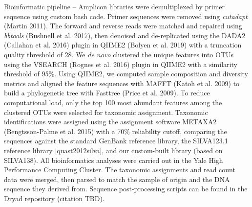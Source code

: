 \documentclass[12pt,]{article}
\begin{document}
Bioinformatic pipeline -- Amplicon libraries were demultiplexed by primer sequence using custom bash code. Primer sequences were removed using \emph{cutadapt} (Martin 2011). The forward and reverse reads were matched and repaired using \emph{bbtools} (Bushnell et al. 2017), then denoised and de-replicated using the DADA2 (Callahan et al. 2016) plugin in QIIME2 (Bolyen et al. 2019) with a truncation quality threshold of 28. We \emph{de novo} clustered the unique features into OTUs using the VSEARCH (Rognes et al. 2016) plugin in QIIME2 with a similarity threshold of 95\%. Using QIIME2, we computed sample composition and diversity metrics and aligned the feature sequences with MAFFT (Katoh et al. 2009) to build a phylogenetic tree with Fasttree (Price et al. 2009). To reduce computational load, only the top 100 most abundant features among the clustered OTUs were selected for taxonomic assignment. Taxonomic identifications were assigned using the assignment software METAXA2 (Bengtsson-Palme et al. 2015) with a 70\% reliability cutoff, comparing the sequences against the standard GenBank reference library, the SILVA123.1 reference library {[}quast2012silva{]}, and our custom-built library (based on SILVA138). All bioinformatics analyses were carried out in the Yale High Performance Computing Cluster. The taxonomic assignments and read count data were merged, then parsed to match the sample of origin and the DNA sequence they derived from. Sequence post-processing scripts can be found in the Dryad repository (citation TBD).
\end{document}
